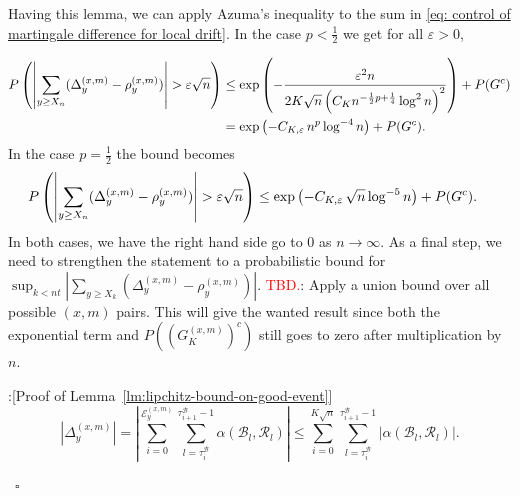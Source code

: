\documentclass[twoside,12pt,a4paper]{article}
\numberwithin{equation}{section}
\newenvironment{proof}{{\sc Proof}:}{~\hfill $\square$}
\newcommand\TBD{\textcolor{red}{TBD.}}
\begin{document}
{Having this lemma, we can apply Azuma's inequality to the sum in \eqref{eq: control of martingale difference for local drift}. In the case $p < \frac{1}{2}$ we get for all $\varepsilon>0$,

\begin{align}
	P\left( \left| \sum_{y\ge X_n} (\Delta_y^{(x,m)} - \rho_y^{(x,m)})  \right| > \varepsilon \sqrt{n}  \right) \notag
	&\le \exp\left( - \frac{\varepsilon^2 n}{2 K \sqrt{n} \left( C_{K} n^{-\frac{1}{2}p + \frac{1}{4}} \log^2 n  \right)^2 } \right) + P(G^c) \notag \\
	&= \exp\left( - C_{K, \varepsilon} \, n^{p } \log^{-4} n \right) +P(G^c) \label{eqn:azuma-drift-martingale}
.\end{align}
In the case $p = \frac{1}{2}$ the bound becomes
\begin{align}
	P\left( \left| \sum_{y \ge X_n} (\Delta_y^{(x,m)} - \rho_y^{(x,m)}) \right|  > \varepsilon \sqrt{n}  \right) \notag
	&\le  \exp\left( - C_{K, \varepsilon} \, \sqrt{n}  \log^{-5} n \right) +P(G^c) 
.\end{align}
In both cases, we have the right hand side go to $0$ as $n \to  \infty $. As a final step, we need to strengthen the statement to a probabilistic bound for $\sup_{k < nt} \left| \sum_{y \ge X_k} (\Delta_y^{(x,m)} - \rho_y^{(x,m)}) \right|$. \TBD: Apply a union bound over all possible $(x,m)$ pairs. This will give the wanted result since both the exponential term and $P((G_K^{(x,m)})^c)$ still goes to zero after multiplication by $n$.

\begin{proof}[Proof of Lemma~\ref{lm:lipchitz-bound-on-good-event}]
	\begin{equation*}
	\left| \Delta_y^{(x,m)} \right| 
	= 
	\left| 	\sum_{i = 0}^{\mathcal{E}_y^{(x,m)}} 
	\sum_{l = \tau_i^{\mathcal{B}}} ^{\tau_{i+1}^{\mathcal{B}}  -1}
	\alpha(\mathcal{B}_l, \mathcal{R}_l)
	\right| 
	\le 
	\sum_{i = 0}^{K \sqrt{n} } 
	\sum_{l = \tau_i^{\mathcal{B}}} ^{\tau_{i+1}^{\mathcal{B}}  -1}
	\left|
	\alpha(\mathcal{B}_l, \mathcal{R}_l)
	\right| 
	.
\end{equation*}


\end{proof}}
\end{document}
